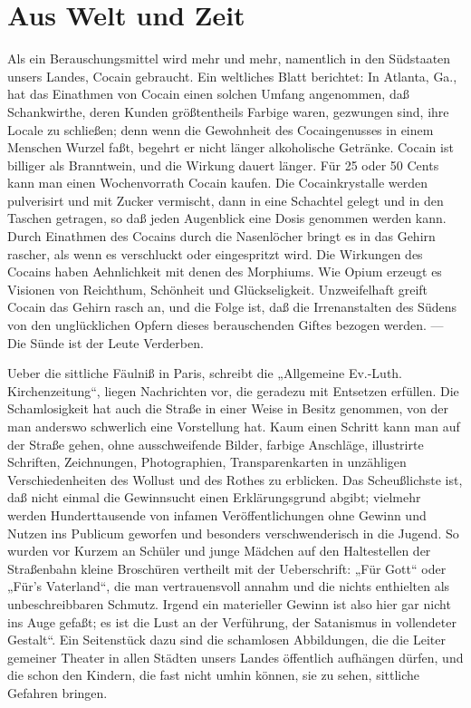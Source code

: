 \chapter{Aus Welt und Zeit}

Als ein Berauschungsmittel wird mehr und mehr, namentlich in den Südstaaten unsers Landes, Cocain gebraucht. Ein weltliches Blatt berichtet: In Atlanta, Ga., hat das Einathmen von Cocain einen solchen Umfang angenommen, daß Schankwirthe, deren Kunden größtentheils Farbige waren, gezwungen sind, ihre Locale zu schließen; denn wenn die Gewohnheit des Cocaingenusses in einem Menschen Wurzel faßt, begehrt er nicht länger alkoholische Getränke. Cocain ist billiger als Branntwein, und die Wirkung dauert länger. Für 25 oder 50 Cents kann man einen Wochenvorrath Cocain kaufen. Die Cocainkrystalle werden pulverisirt und mit Zucker vermischt, dann in eine Schachtel gelegt und in den Taschen getragen, so daß jeden Augenblick eine Dosis genommen werden kann. Durch Einathmen des Cocains durch die Nasenlöcher bringt es in das Gehirn rascher, als wenn es verschluckt oder eingespritzt wird. Die Wirkungen des Cocains haben Aehnlichkeit mit denen des Morphiums. Wie Opium erzeugt es Visionen von Reichthum, Schönheit und Glückseligkeit. Unzweifelhaft greift Cocain das Gehirn rasch an, und die Folge ist, daß die Irrenanstalten des Südens von den unglücklichen Opfern dieses berauschenden Giftes bezogen werden. — Die Sünde ist der Leute Verderben.

Ueber die sittliche Fäulniß in Paris, schreibt die „Allgemeine Ev.-Luth. Kirchenzeitung“, liegen Nachrichten vor, die geradezu mit Entsetzen erfüllen. Die Schamlosigkeit hat auch die Straße in einer Weise in Besitz genommen, von der man anderswo schwerlich eine Vorstellung hat. Kaum einen Schritt kann man auf der Straße gehen, ohne ausschweifende Bilder, farbige Anschläge, illustrirte Schriften, Zeichnungen, Photographien, Transparenkarten in unzähligen Verschiedenheiten des Wollust und des Rothes zu erblicken. Das Scheußlichste ist, daß nicht einmal die Gewinnsucht einen Erklärungsgrund abgibt; vielmehr werden Hunderttausende von infamen Veröffentlichungen ohne Gewinn und Nutzen ins Publicum geworfen und besonders verschwenderisch in die Jugend. So wurden vor Kurzem an Schüler und junge Mädchen auf den Haltestellen der Straßenbahn kleine Broschüren vertheilt mit der Ueberschrift: „Für Gott“ oder „Für’s Vaterland“, die man vertrauensvoll annahm und die nichts enthielten als unbeschreibbaren Schmutz. Irgend ein materieller Gewinn ist also hier gar nicht ins Auge gefaßt; es ist die Lust an der Verführung, der Satanismus in vollendeter Gestalt“. Ein Seitenstück dazu sind die schamlosen Abbildungen, die die Leiter gemeiner Theater in allen Städten unsers Landes öffentlich aufhängen dürfen, und die schon den Kindern, die fast nicht umhin können, sie zu sehen, sittliche Gefahren bringen.
